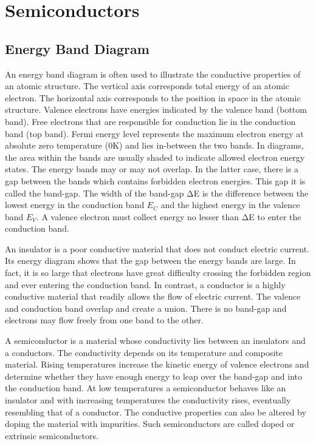 \chapter{Semiconductors}
\label{chap:Semi}

\section{Energy Band Diagram}

An energy band diagram is often used to illustrate the conductive properties of an atomic structure. The vertical axis corresponds total energy of an atomic electron. The horizontal axis corresponds to the position in space in the atomic structure. Valence electrons have energies indicated by the valence band (bottom band). Free electrons that are responsible for conduction lie in the conduction band (top band). Fermi energy level represents the maximum electron energy at absolute zero temperature (0K) and lies in-between the two bands. In diagrams, the area within the bands are usually shaded to indicate allowed electron energy states. The energy bands may or may not overlap. In the latter case, there is a gap between the bands which contains forbidden electron energies. This gap it is called the band-gap. The width of the band-gap ΔE is the difference between the lowest energy in the conduction band $E_C$ and the highest energy in the valence band $E_V$. A valence electron must collect energy no lesser than ΔE to enter the conduction band.

An insulator is a poor conductive material that does not conduct electric current. Its energy diagram shows that the gap between the energy bands are large. In fact, it is so large that electrons have great difficulty crossing the forbidden region and ever entering the conduction band.
In contrast, a conductor is a highly conductive material that readily allows the flow of electric current. The valence and conduction band overlap and create a union. There is no band-gap and electrons may flow freely from one band to the other.

A semiconductor is a material whose conductivity lies between an insulators and a conductors. The conductivity depends on its temperature and composite material. Rising temperatures increase the kinetic energy of valence electrons and determine whether they have enough energy to leap over the band-gap and into the conduction band. At low temperatures a semiconductor behaves like an insulator and with increasing temperatures the conductivity rises, eventually resembling that of a conductor. The conductive properties can also be altered by doping the material with impurities. Such semiconductors are called doped or extrinsic semiconductors.


